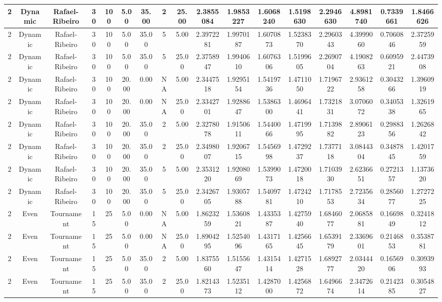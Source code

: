 \documentclass[a4paper]{article}
\begin{document}
\begin{center}
\begin{tabular}{ | c | c | c | c | c | c | c | c | c | c | c | c | c | c | c | c | c | }
		\hline
		2	&	Dynamic	&	Rafael-Ribeiro	&	30	&	100	&	5.00	&	35.00	&	2	&	25.00	&	2.3855084	&	1.9853227	&	1.6068240	&	1.5198630	&	2.2946630	&	4.8981740	&	0.7339661	&	1.8466626 \\
		\hline
		2	&	Dynamic	&	Rafael-Ribeiro	&	30	&	100	&	5.00	&	35.00	&	5	&	5.00	&	2.3972281	&	1.9970187	&	1.6070873	&	1.5238370	&	2.2960343	&	4.3999060	&	0.7060846	&	2.3725959 \\
		\hline
		2	&	Dynamic	&	Rafael-Ribeiro	&	30	&	100	&	5.00	&	35.00	&	5	&	25.00	&	2.3758947	&	1.9940610	&	1.6076306	&	1.5199605	&	2.2690704	&	4.1908263	&	0.6095921	&	2.4473908 \\
		\hline
		2	&	Dynamic	&	Rafael-Ribeiro	&	30	&	100	&	20.00	&	0.00	&	NA	&	5.00	&	2.3447518	&	1.9295154	&	1.5419736	&	1.4711050	&	1.7196722	&	2.9361258	&	0.3043266	&	1.3960919 \\
		\hline
		2	&	Dynamic	&	Rafael-Ribeiro	&	30	&	100	&	20.00	&	0.00	&	NA	&	25.00	&	2.3342701	&	1.9288647	&	1.5386300	&	1.4696441	&	1.7321831	&	3.0706072	&	0.3405338	&	1.3261965 \\
		\hline
		2	&	Dynamic	&	Rafael-Ribeiro	&	30	&	100	&	20.00	&	35.00	&	2	&	5.00	&	2.3278078	&	1.9150611	&	1.5440066	&	1.4719995	&	1.7139882	&	2.8906123	&	0.2988356	&	1.2626842 \\
		\hline
		2	&	Dynamic	&	Rafael-Ribeiro	&	30	&	100	&	20.00	&	35.00	&	2	&	25.00	&	2.3498007	&	1.9206715	&	1.5456998	&	1.4729237	&	1.7377118	&	3.0844304	&	0.3487845	&	1.4201759 \\
		\hline
		2	&	Dynamic	&	Rafael-Ribeiro	&	30	&	100	&	20.00	&	35.00	&	5	&	5.00	&	2.3531220	&	1.9208069	&	1.5399073	&	1.4720018	&	1.7103930	&	2.6236651	&	0.2721357	&	1.1373620 \\
		\hline
		2	&	Dynamic	&	Rafael-Ribeiro	&	30	&	100	&	20.00	&	35.00	&	5	&	25.00	&	2.3426705	&	1.9305788	&	1.5409781	&	1.4724210	&	1.7178553	&	2.7235634	&	0.2856077	&	1.2727225 \\
		\hline
		2	&	Even	&	Tournament	&	15	&	25	&	5.00	&	0.00	&	NA	&	5.00	&	1.8623259	&	1.5360821	&	1.4335387	&	1.4275940	&	1.6846077	&	2.0685881	&	0.1669849	&	0.3241812 \\
		\hline
		2	&	Even	&	Tournament	&	15	&	25	&	5.00	&	0.00	&	NA	&	25.00	&	1.8904295	&	1.5254096	&	1.4317165	&	1.4256645	&	1.6539179	&	2.3369601	&	0.2146853	&	0.3538781 \\
		\hline
		2	&	Even	&	Tournament	&	15	&	25	&	5.00	&	35.00	&	2	&	5.00	&	1.8375560	&	1.5155647	&	1.4315414	&	1.4271528	&	1.6892777	&	2.0344420	&	0.1656906	&	0.3093993 \\
		\hline
		2	&	Even	&	Tournament	&	15	&	25	&	5.00	&	35.00	&	2	&	25.00	&	1.8214373	&	1.5235112	&	1.4287000	&	1.4256872	&	1.6496674	&	2.3472614	&	0.2142385	&	0.3054827 \\

\end{tabular}
\end{center}
\end{document}
